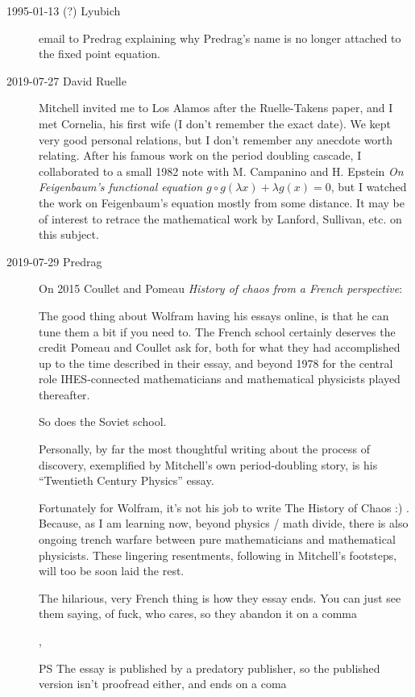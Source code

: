 \begin{description}
\item[1995-01-13 (?) Lyubich]
email to Predrag explaining why Predrag's name is no longer attached
to the fixed point equation.

\item[2019-07-27 David Ruelle] %
Mitchell invited me to Los Alamos after the Ruelle-Takens paper, and I
met Cornelia, his first wife (I don't remember the exact date).  We kept
very good personal relations, but I don't remember any anecdote worth
relating.  After his famous work on the period doubling cascade, I
collaborated to a small 1982 note with M. Campanino and H.
Epstein {\em On {Feigenbaum}'s functional equation {$g \circ
g(\lambda x) + \lambda g(x) = 0$}}, but I watched the work on
Feigenbaum's equation mostly from some distance.  It may be of interest
to retrace the mathematical work by Lanford, Sullivan, etc. on this
subject.


\item[2019-07-29 Predrag]
On 2015 Coullet and Pomeau
{\em History of chaos from a {French} perspective}:

The good thing about Wolfram having his essays online, is that he can
tune them a bit if you need to. The French school certainly deserves the
credit Pomeau and Coullet ask for, both for what they had accomplished up
to the time described in their essay, and beyond 1978 for the central
role IHES-connected mathematicians and mathematical physicists played
thereafter.

So does the Soviet school.

Personally, by far the most thoughtful writing about the process of
discovery, exemplified by Mitchell's own period-doubling story, is his
``Twentieth Century Physics'' essay.

Fortunately for Wolfram, it's not his job to write The History of Chaos
:) . Because, as I am learning now, beyond physics / math divide, there
is also ongoing trench warfare between pure mathematicians and
mathematical physicists. These lingering resentments, following in
Mitchell's footsteps, will too be soon laid the rest.

The hilarious, very French thing is how they essay ends. You can just see
them saying, of fuck, who cares, so they abandon it on a comma

,

\medskip

PS The essay is published by a predatory publisher, so the published
version isn't proofread either, and ends on a coma


\end{description}
